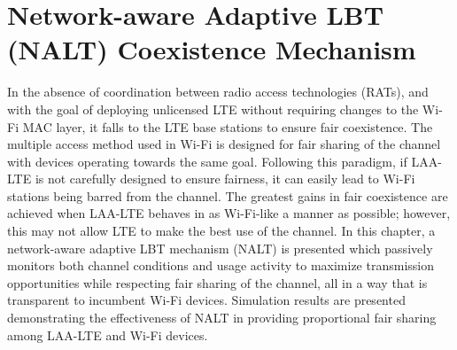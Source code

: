 %
%
%


\chapter{Network-aware Adaptive LBT (NALT) Coexistence Mechanism}
\label{intro-NALT} %



In the absence of coordination between radio access technologies (RATs), and with the goal of deploying unlicensed LTE without requiring changes to the \mbox{Wi-Fi} MAC layer, it falls to the LTE base stations to ensure fair coexistence. The multiple access method used in \mbox{Wi-Fi} is designed for fair sharing of the channel with devices operating towards the same goal. Following this paradigm, if \mbox{LAA-LTE} is not carefully designed to ensure fairness, it can easily lead to \mbox{Wi-Fi} stations being barred from the channel. The greatest gains in fair coexistence are achieved when \mbox{LAA-LTE} behaves in as \mbox{Wi-Fi}-like a manner as possible; however, this may not allow LTE to make the best use of the channel.  In this chapter, a network-aware adaptive LBT mechanism (NALT) is presented which passively monitors both channel conditions and usage activity to maximize transmission opportunities while respecting fair sharing of the channel, all in a way that is transparent to incumbent \mbox{Wi-Fi} devices. Simulation results are presented demonstrating the effectiveness of NALT in providing proportional fair sharing among \mbox{LAA-LTE} and \mbox{Wi-Fi} devices.


